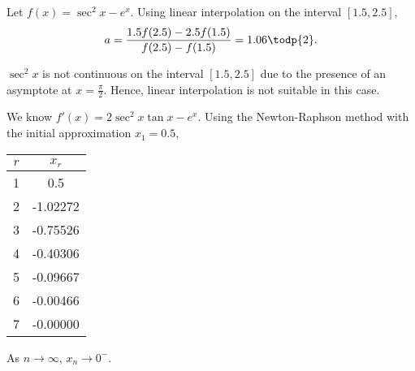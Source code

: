 \begin{solution}
\begin{ppart}
\begin{minipage}{0.45\textwidth}
\begin{center}
            \end{center}
        \end{minipage}
    \end{ppart}

    \begin{ppart}
        Let $f(x) = \sec^2 x - e^x$. Using linear interpolation on the interval $[1.5, 2.5]$, \[a = \frac{1.5f(2.5)-2.5f(1.5)}{f(2.5) - f(1.5)} = 1.06 \todp{2}.\]

        $\sec^2{x}$ is not continuous on the interval $[1.5, 2.5]$ due to the presence of an asymptote at $x = \frac{\pi}2$. Hence, linear interpolation is not suitable in this case.
    \end{ppart}

    \begin{ppart}
        We know $f'(x) = 2\sec^2 x \tan x -e^x$. Using the Newton-Raphson method with the initial approximation $x_1 = 0.5$,
        \begin{table}[H]
            \centering
            \begin{tabular}{|c|c|}
            \hline
            $r$ & $x_r$ \\ \hline
            1 & 0.5 \\ \hline
            2 & -1.02272 \\ \hline
            3 & -0.75526 \\ \hline
            4 & -0.40306 \\ \hline
            5 & -0.09667 \\ \hline
            6 & -0.00466 \\ \hline
            7 & -0.00000 \\ \hline
            \end{tabular}
        \end{table}
        As $n \to \infty$, $x_n \to 0^-$. 
        
        \begin{center}
\end{center}
\end{ppart}
\end{solution}
